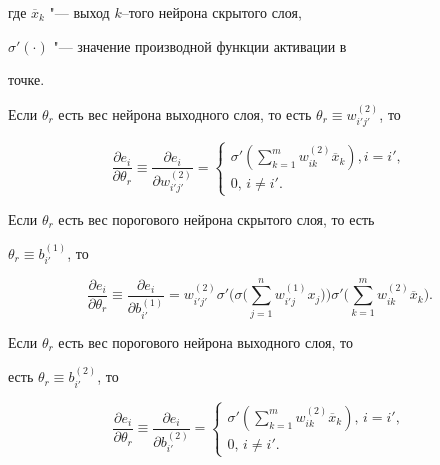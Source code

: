 где ${\overline{x}}_k$ "--- выход $k$--того нейрона скрытого слоя,

$\sigma'(\cdot )$ "--- значение производной функции активации в

точке.



Если $\theta_r$ есть вес нейрона выходного слоя, то есть $\theta_r

\equiv w^{(2)}_{i'j'}$, то

\[

\frac{\partial e_i}{\partial \theta_r} \equiv \frac{\partial

e_i}{\partial w^{(2)}_{i'j'}} = \begin{cases}

\sigma' \left(\sum \limits^m_{k=1} w^{(2)}_{ik}\overline{x}_k\right), i=i', \\

0,\, i \ne i'.

\end{cases}

\]

Если $\theta_r$ есть вес порогового нейрона скрытого слоя, то есть

$\theta_r \equiv b^{(1)}_{i'}$, то

\[

\frac{\partial e_i}{\partial \theta_r}\equiv \frac{\partial

e_i}{\partial b^{(1)}_{i'}}=w^{( 2 )}_{i'j'}\sigma'\Biggl(\sigma

\Biggl(\sum^n_{j=1}w^{(1)}_{i'j}x_j\Biggr)\Biggr)\sigma'\Biggl(\sum^m_{k=1}

w^{(2)}_{ik}\overline{x}_k \Biggr).

\]

Если $\theta_r$ есть вес порогового нейрона выходного слоя, то

есть $\theta_r\equiv b^{(2)}_{i'}$, то

\[

\frac{\partial e_i}{\partial \theta_r}\equiv \frac{\partial

e_i}{\partial b^{(2)}_{i'}} = \begin{cases}

\sigma' \left(\sum \limits^m_{k=1}w^{(2)}_{ik}\overline{x}_k\right),\,i=i', \\

0,\,i\ne i'.

\end{cases}

\]



